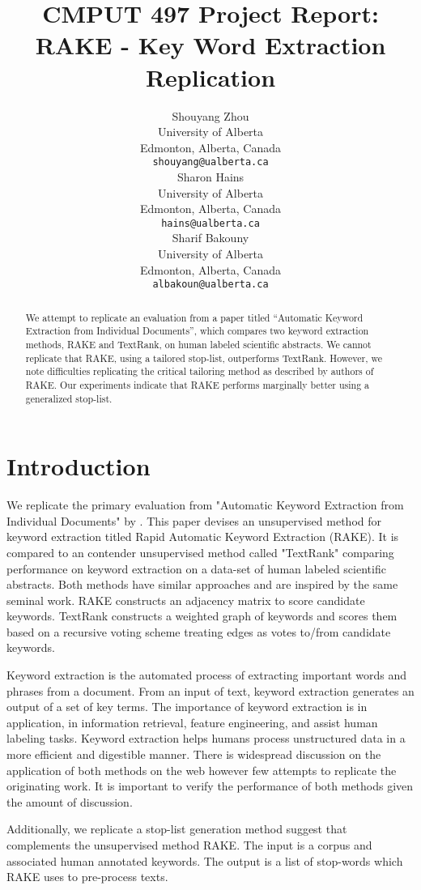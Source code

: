 \documentclass[11pt,a4paper]{article}
\title{CMPUT 497 Project Report: \\ RAKE - Key Word Extraction Replication}
\author{Shouyang Zhou \\
  University of Alberta \\
  Edmonton, Alberta, Canada \\
  {\tt shouyang@ualberta.ca} \\\And
  Sharon Hains \\
  University of Alberta \\
  Edmonton, Alberta, Canada \\
  {\tt hains@ualberta.ca} \\\And
  Sharif Bakouny\\
  University of Alberta \\
  Edmonton, Alberta, Canada \\
  {\tt albakoun@ualberta.ca} \\}
\date{}
\begin{document}
\maketitle

\begin{abstract}
We attempt to replicate an evaluation from a paper titled  “Automatic Keyword Extraction from Individual Documents”, which compares two keyword extraction methods, RAKE and TextRank, on human labeled scientific abstracts. We cannot replicate that RAKE, using a tailored stop-list, outperforms TextRank. However, we note difficulties replicating the critical tailoring method as described by authors of RAKE. Our experiments indicate that RAKE performs marginally better using a generalized stop-list. 	
\end{abstract}

\section{Introduction}

We replicate the primary evaluation from "Automatic Keyword Extraction from Individual Documents" by \citet{1}. This paper devises an unsupervised method for keyword extraction titled Rapid Automatic Keyword Extraction (RAKE). It is compared to an contender unsupervised method called "TextRank" comparing performance on keyword extraction on a data-set of human labeled scientific abstracts. Both methods have similar approaches and are inspired by the same seminal work. RAKE constructs an adjacency matrix to score candidate keywords. TextRank constructs a weighted graph of keywords and scores them based on a recursive voting scheme treating edges as votes to/from candidate keywords.

Keyword extraction is the automated process of extracting important words and phrases from a document. From an input of text, keyword extraction generates an output of a set of key terms. The importance of keyword extraction is in application, in information retrieval, feature engineering, and assist human labeling tasks. Keyword extraction helps humans process unstructured data in a more efficient and digestible manner. There is widespread discussion on the application of both methods on the web however few attempts to replicate the originating work. It is important to verify the performance of both methods given the amount of discussion.  

Additionally, we replicate a stop-list generation method \citet{1} suggest that complements the unsupervised method RAKE. The input is a corpus and associated human annotated keywords. The output is a list of stop-words which RAKE uses to pre-process texts. 
\end{document}
